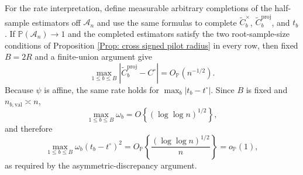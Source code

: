 \documentclass[12pt]{article}
\newenvironment{bluechange}{\begingroup\color[rgb]{0.00,0.00,1.00}}{\endgroup}
\theoremstyle{remark}
\theoremstyle{plain}
\begin{document}
\begin{bluechange}
For the rate interpretation, define measurable arbitrary completions of the half-sample estimators off $\mathcal A_n$ and use the same formulas to complete $\widetilde C_b^{\times}$, $\widetilde C_b^{\mathrm{proj}}$, and $t_b$. If $\mathbb P(\mathcal A_n)\to1$ and the completed estimators satisfy the two root-sample-size conditions of Proposition \ref{Prop: cross signed pilot radius} in every row, then fixed $B=2R$ and a finite-union argument give
\[
\max_{1\le b\le B}\left|\widetilde C_b^{\mathrm{proj}}-C^\circ\right|
=O_{\mathbb P}(n^{-1/2}).
\]
Because $\psi$ is affine, the same rate holds for $\max_b|t_b-t^\circ|$. Since $B$ is fixed and $n_{b,\mathrm{val}}\asymp n$,
\[
\max_{1\le b\le B}\omega_b
=O\!\left\{(\log\log n)^{1/2}\right\},
\]
and therefore
\[
\max_{1\le b\le B}\omega_b(t_b-t^\circ)^2
=O_{\mathbb P}\!\left\{
\frac{(\log\log n)^{1/2}}{n}
\right\}
=o_{\mathbb P}(1),
\]
as required by the asymmetric-discrepancy argument.


\end{bluechange}
\end{document}
